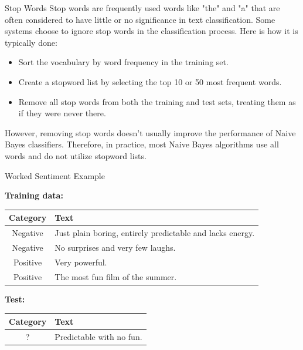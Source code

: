 \documentclass[handout]{beamer}
\begin{document}
\begin{frame}{Stop Words}
\scriptsize
Stop words are frequently used words like "the" and "a" that are often considered to have little or no significance in text classification. Some systems choose to ignore stop words in the classification process. Here is how it is typically done:

\begin{itemize}
    \item Sort the vocabulary by word frequency in the training set.
    \item Create a stopword list by selecting the top 10 or 50 most frequent words.
    \item Remove all stop words from both the training and test sets, treating them as if they were never there.
\end{itemize}

However, removing stop words doesn't usually improve the performance of Naive Bayes classifiers. Therefore, in practice, most Naive Bayes algorithms use all words and do not utilize stopword lists.
\end{frame}

\begin{frame}{Worked Sentiment Example}

\textbf{Training data:} 

\begin{table}[h]
\centering
\begin{tabular}{|c|p{}|}
\hline
\textbf{Category} & \textbf{Text} \\
\hline
Negative & Just plain boring, entirely predictable and lacks energy. \\
\hline
Negative & No surprises and very few laughs. \\
\hline
Positive & Very powerful. \\
\hline
Positive & The most fun film of the summer. \\
\hline
\end{tabular}
\end{table}


\textbf{Test:} 
\begin{table}[h]
\centering
\begin{tabular}{|c|p{}|}
\hline
\textbf{Category} & \textbf{Text} \\
\hline
? & Predictable with no fun. \\
\hline
\end{tabular}
\end{table}

\end{frame}
\end{document}
